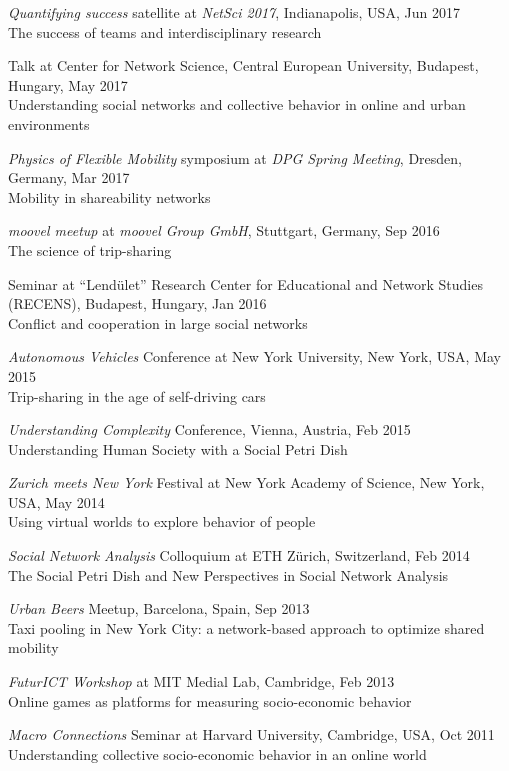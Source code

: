 \documentclass[10pt,a4paper]{article}
\renewenvironment{itemize}{
  \begin{list}{}{
    \setlength{\leftmargin}{1.5em}
    \setlength{\itemsep}{0.25em}
    \setlength{\parskip}{0pt}
    \setlength{\parsep}{0.25em}
  }
}{
  \end{list}
}
\begin{document}
\begin{itemize}
\item{\emph{Quantifying success} satellite at \emph{NetSci 2017}, Indianapolis, USA, Jun 2017\\The success of teams and interdisciplinary research}
\item{Talk at Center for Network Science, Central European University, Budapest, Hungary, May 2017\\ {Understanding social networks and collective behavior in online and urban environments}}
\item{\emph{Physics of Flexible Mobility} symposium at \emph{DPG Spring Meeting}, Dresden, Germany, Mar 2017\\ {Mobility in shareability networks}}
\item{\emph{moovel meetup} at \emph{moovel Group GmbH}, Stuttgart, Germany, Sep 2016\\ {The science of trip-sharing}}
\item{Seminar at ``Lend\"ulet'' Research Center for Educational and Network Studies (RECENS), Budapest, Hungary, Jan 2016\\Conflict and cooperation in large social networks}
\item{\emph{Autonomous Vehicles} Conference at New York University, New York, USA, May 2015\\Trip-sharing in the age of self-driving cars}
\item{\emph{Understanding Complexity} Conference, Vienna, Austria, Feb 2015\\Understanding Human Society with a Social Petri Dish}
\item{\emph{Zurich meets New York} Festival at New York Academy of Science, New York, USA, May 2014\\Using virtual worlds to explore behavior of people}
\item{\emph{Social Network Analysis} Colloquium at ETH Z{\"u}rich, Switzerland, Feb 2014\\The Social Petri Dish and New Perspectives in Social Network Analysis}
\item{\emph{Urban Beers} Meetup, Barcelona, Spain, Sep 2013\\Taxi pooling in New York City: a network-based approach to optimize shared mobility}
\item{\emph{FuturICT Workshop} at MIT Medial Lab, Cambridge, Feb 2013\\{Online games as platforms for measuring socio-economic behavior}}
\item{\emph{Macro Connections} Seminar at Harvard University, Cambridge, USA, Oct 2011\\Understanding collective socio-economic behavior in an online world}

\end{itemize}
\end{document}
